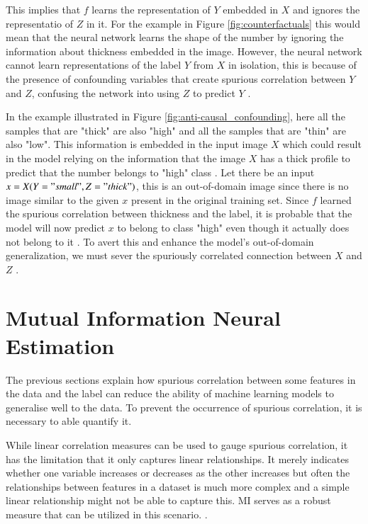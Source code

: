 \documentclass[12pt,DIV14,BCOR12mm,a4paper,footinclude=false,headinclude,parskip=half-,twoside,openright,cleardoublepage=empty,toc=index,bibliography=totoc,listof=totoc]{scrreprt}
\numberwithin{equation}{chapter}
\begin{document}
This implies that $f$ learns the representation of $Y$ embedded in $X$ and ignores the representatio of $Z$ in it. For the example in Figure \ref{fig:counterfactuals} this would mean that the neural network learns the shape of the number by ignoring the information about thickness embedded in the image. However, the neural network cannot learn representations of the label $Y$ from $X$ in isolation, this is because of the presence of confounding variables that create spurious correlation between $Y$ and $Z$, confusing the network into using $Z$ to predict $Y$ \cite{DBLP:journals/corr/abs-2109-05642} \cite{DBLP:journals/corr/abs-2106-00545}. 

In the example illustrated in Figure \ref{fig:anti-causal_confounding}, here all the samples that are "thick" are also "high" and all the samples that are "thin" are also "low". This information is embedded in the input image $X$ which could result in the model relying on the information that the image $X$ has a thick profile to predict that the number belongs to "high" class \cite{10162210}. Let there be an input $x=X(Y="small", Z="thick")$, this is an out-of-domain image since there is no image similar to the given $x$ present in the original training set. Since $f$ learned the spurious correlation between thickness and the label, it is probable that the model will now predict $x$ to belong to class "high" even though it actually does not belong to it \cite{DBLP:journals/corr/abs-2109-05642}. To avert this and enhance the model's out-of-domain generalization, we must sever the spuriously correlated connection between $X$ and $Z$ \cite{10162210}.

\section{Mutual Information Neural Estimation}\label{sec: 2.3}
The previous sections explain how spurious correlation between some features in the data and the label can reduce the ability of machine learning models to generalise well to the data. To prevent the occurrence of spurious correlation, it is necessary to able quantify it. 

While linear correlation measures can be used to gauge spurious correlation, it has the limitation that it only captures linear relationships. It merely indicates whether one variable increases or decreases as the other increases but often the relationships between features in a dataset is much more complex and a simple linear relationship might not be able to capture this. MI serves as a robust measure that can be utilized in this scenario. \cite{Li1990} \cite{10162210}.
\end{document}
